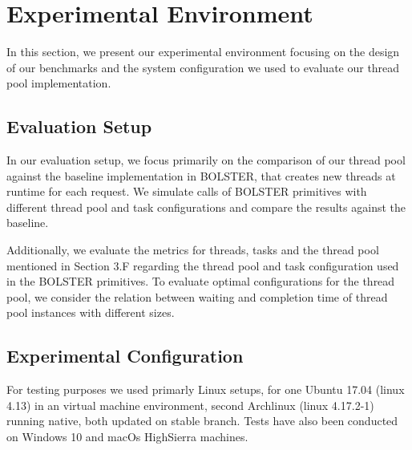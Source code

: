 \documentclass[conference]{IEEEtran}
\begin{document}
\section{Experimental Environment}
In this section, we present our experimental environment focusing on the design of our benchmarks and the system configuration we used to evaluate our thread pool implementation.

\subsection{Evaluation Setup}
In our evaluation setup, we focus primarily on the comparison of our thread pool against the baseline implementation in BOLSTER, that creates new threads at runtime for each request. We simulate calls of BOLSTER primitives with different thread pool and task configurations and compare the results against the baseline.

Additionally, we evaluate the metrics for threads, tasks and the thread pool mentioned in Section 3.F regarding the thread pool and task configuration used in the BOLSTER primitives. To evaluate optimal configurations for the thread pool, we consider the relation between waiting and completion time of  thread pool instances with different sizes.


\subsection{Experimental Configuration}

For testing purposes we used primarly Linux setups, for one Ubuntu 17.04
(linux 4.13) in an virtual machine environment, second Archlinux (linux
4.17.2-1) running native, both updated on stable branch. Tests have also been
conducted on Windows 10 and macOs HighSierra machines.
\end{document}
